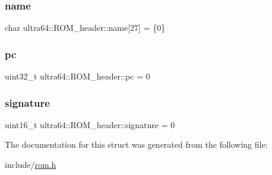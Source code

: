 \subsubsection{\texorpdfstring{name}{name}}
{\footnotesize\ttfamily char ultra64\+::\+R\+O\+M\+\_\+header\+::name\mbox{[}27\mbox{]} = \{0\}}

\mbox{\label{structultra64_1_1_r_o_m__header_a5b7b2660af49b9ce1362631d9ab70faa}} 
\subsubsection{\texorpdfstring{pc}{pc}}
{\footnotesize\ttfamily uint32\+\_\+t ultra64\+::\+R\+O\+M\+\_\+header\+::pc = 0}

\mbox{\label{structultra64_1_1_r_o_m__header_ab207c693797be7e5788aa7f8bd6dbefa}} 
\subsubsection{\texorpdfstring{signature}{signature}}
{\footnotesize\ttfamily uint16\+\_\+t ultra64\+::\+R\+O\+M\+\_\+header\+::signature = 0}



The documentation for this struct was generated from the following file\+:\begin{DoxyCompactItemize}
\item 
include/\hyperlink{rom_8h}{rom.\+h}\end{DoxyCompactItemize}
